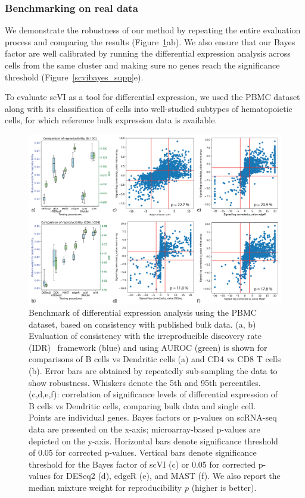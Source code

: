 \subsubsection{Benchmarking on real data}
We demonstrate the robustness of our method by repeating the entire evaluation process and comparing the results (Figure~\ref{scvibayes_panel}ab). We also ensure that our Bayes factor are well calibrated by running the differential expression analysis across cells from the same cluster and making sure no genes reach the significance threshold (Figure~\ref{scvibayes_supp}e).

To evaluate scVI as a tool for differential expression, we used the PBMC dataset along with its classification of cells into well-studied subtypes of hematopoietic cells, for which reference bulk expression data is available. 

\begin{figure}
    \centering
    \includegraphics[width=\textwidth]{figures/Figure-4.png}
    \caption[Benchmark of differential expression analysis using the PBMC dataset]{Benchmark of differential expression analysis using the PBMC dataset, based on consistency with published bulk data. (a, b) Evaluation of consistency with the irreproducible discovery rate (IDR)~\cite{Li2011} framework (blue) and using AUROC (green) is shown for comparisons of B cells vs Dendritic cells (a) and CD4 vs CD8 T cells (b). Error bars are obtained by repeatedly sub-sampling the data to show robustness. Whiskers denote the 5th and 95th percentiles.  (c,d,e,f): correlation of significance levels of differential expression of B cells vs Dendritic cells, comparing bulk data and single cell. Points are individual genes. Bayes factors or p-values on scRNA-seq data are presented on the x-axis; microarray-based  p-values are depicted on the y-axis. Horizontal bars denote significance threshold of 0.05 for corrected p-values. Vertical bars denote significance threshold for the Bayes factor of scVI (c) or 0.05 for corrected p-values for DESeq2 (d), edgeR (e), and MAST (f). We also report the median mixture weight for reproducibility $p$ (higher is better).}
    \label{scvibayes_panel}
    \end{figure}

